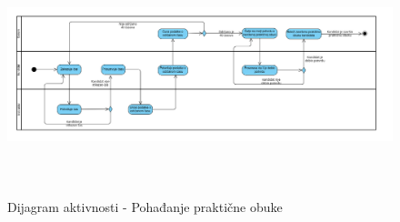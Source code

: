 \begin{figure}[H]
  \begin{center}
      \includegraphics[width=140mm, height=70mm]{Diagrams/dijagram_aktivnosti_pohadjanje_prakticne_obuke.png}
  \end{center}
  \caption {Dijagram aktivnosti - Pohađanje praktične obuke}
  \label{activity_pohadjanje_prakticne_obuke}

\end{figure}
